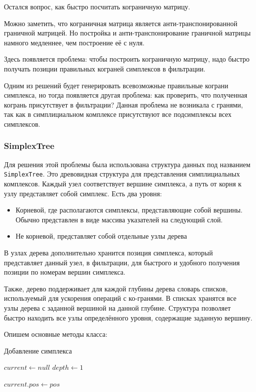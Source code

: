 \documentclass{article}
\begin{document}
Остался вопрос, как быстро посчитать кограничную матрицу.

Можно заметить, что кограничная матрица является анти-транспонированной граничной матрицей. Но постройка и анти-транспонирование граничной матрицы намного медленнее, чем построение её с нуля.

Здесь появляется проблема: чтобы построить кограничную матрицу, надо быстро получать позиции правильных кограней симплексов в фильтрации.

Одним из решений будет генерировать всевозможные правильные кограни симплекса, но тогда появляется другая проблема: как проверить, что полученная когрань присутствует в фильтрации? Данная проблема не возникала с гранями, так как в симплициальном комплексе присутствуют все подсимплексы всех симплексов.

\subsubsection{SimplexTree}
Для решения этой проблемы была использована структура данных под названием \texttt{SimplexTree}. Это древовидная структура для представления симплициальных комплексов. Каждый узел соответствует вершине симплекса, а путь от корня к узлу представляет собой симплекс. Есть два уровня:
\begin{itemize}
  \item Корневой, где располагаются симплексы, представляющие собой вершины. Обычно представлен в виде массива указателей на следующий слой.
  \item Не корневой, представляет собой отдельные узлы дерева
\end{itemize}

В узлах дерева дополнительно хранится позиция симплекса, который представляет данный узел, в фильтрации, для быстрого и удобного получения позиции по номерам вершин симплекса.

Также, дерево поддерживает для каждой глубины дерева словарь списков, используемый для ускорения операций с ко-гранями. В списках хранятся все узлы дерева с заданной вершиной на данной глубине. Структура позволяет быстро находить все узлы определённого уровня, содержащие заданную вершину.

Опишем основные методы класса:

\begin{algorithm}[H]
\caption{Добавление симплекса}
$current \gets null$
$depth \gets 1$


 {
  $current.pos \gets pos$
}
\end{algorithm}
\end{document}
